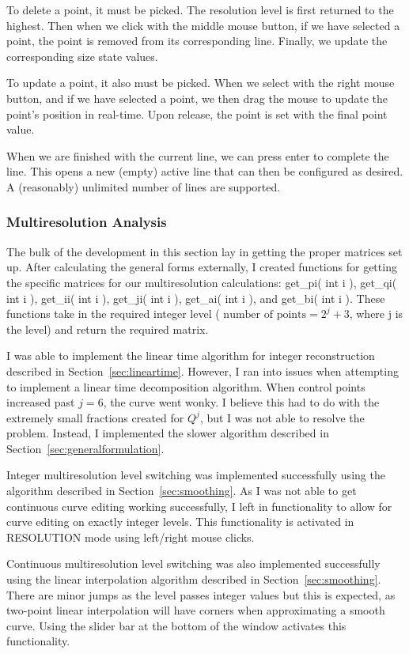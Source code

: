 \documentclass[11pt]{article}
\renewcommand{\sec}[1]{Section~\ref{sec:#1}}
\begin{document}
To delete a point, it must be picked. The resolution level is first returned to the highest. Then when we click with the middle mouse button, if we have selected a point, the point is removed from its corresponding line. Finally, we update the corresponding size state values.

To update a point, it also must be picked. When we select with the right mouse button, and if we have selected a point, we then drag the mouse to update the point's position in real-time. Upon release, the point is set with the final point value.

When we are finished with the current line, we can press enter to complete the line. This opens a new (empty) active line that can then be configured as desired. A (reasonably) unlimited number of lines are supported.

\subsubsection{Multiresolution Analysis}
\label{sec:multiresolutionanalysis}
The bulk of the development in this section lay in getting the proper matrices set up. After calculating the general forms externally, I created functions for getting the specific matrices for our multiresolution calculations: get\_pi( int i ), get\_qi( int i ), get\_ii( int i ), get\_ji( int i ), get\_ai( int i ), and get\_bi( int i ). These functions take in the required integer level ( $\text{number of points} = 2^{j} + 3$, where j is the level) and return the required matrix.

I was able to implement the linear time algorithm for integer reconstruction described in \sec{lineartime}. However, I ran into issues when attempting to implement a linear time decomposition algorithm. When control points increased past $j = 6$, the curve went wonky. I believe this had to do with the extremely small fractions created for $Q^{j}$, but I was not able to resolve the problem. Instead, I implemented the slower algorithm described in \sec{generalformulation}.

Integer multiresolution level switching was implemented successfully using the algorithm described in \sec{smoothing}. As I was not able to get continuous curve editing working successfully, I left in functionality to allow for curve editing on exactly integer levels. This functionality is activated in RESOLUTION mode using left/right mouse clicks.

Continuous multiresolution level switching was also implemented successfully using the linear interpolation algorithm described in \sec{smoothing}. There are minor jumps as the level passes integer values but this is expected, as two-point linear interpolation will have corners when approximating a smooth curve. Using the slider bar at the bottom of the window activates this functionality.
\end{document}
